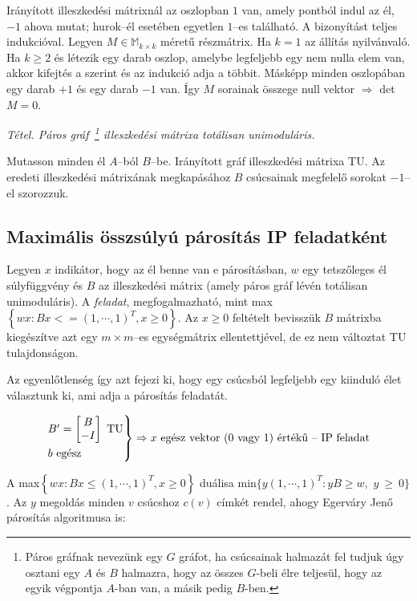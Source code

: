 Irányított illeszkedési mátrixnál az oszlopban $1$ van, amely pontból indul az
él, $-1$ ahova mutat; hurok--él esetében egyetlen $1$--es található. A
bizonyítást teljes indukcióval. Legyen $M \in \mathbb{M}_{k\times k}$ méretű
részmátrix. Ha $k=1$ az állítás nyilvánvaló. Ha $k \geq 2$ és létezik egy darab
oszlop, amelybe legfeljebb egy nem nulla elem van, akkor kifejtés a szerint és az
indukció adja a többit. Másképp minden oszlopában egy darab $+1$ és egy darab
$-1$ van. Így $M$ sorainak összege null vektor $\Rightarrow$ det$M=0$.
\vspace{0.4cm}

\emph{Tétel. Páros gráf~\footnote{Páros gráfnak nevezünk egy $G$ gráfot, ha
csúcsainak halmazát fel tudjuk úgy osztani egy $A$ és $B$ halmazra, hogy az
összes $G$-beli élre teljesül, hogy az egyik végpontja $A$-ban van, a másik
pedig $B$-ben.} illeszkedési mátrixa totálisan unimoduláris.}
\vspace{0.4cm}

Mutasson minden él $A$--ból $B$--be. Irányított gráf illeszkedési mátrixa TU. Az
eredeti illeszkedési mátrixának megkapásához $B$ csúcsainak megfelelő sorokat
$-1$--el szorozzuk.

\subsection{Maximális összsúlyú párosítás IP feladatként}

Legyen $x$ indikátor, hogy az él benne van e párosításban, $w$ egy tetszőleges
él súlyfüggvény és $B$ az illeszkedési mátrix (amely páros gráf lévén totálisan
unimoduláris). A \emph{feladat}, megfogalmazható, mint max$\left\{ wx:Bx <= (1,
\cdots, 1)^T, x \geq 0 \right\}$. Az $x \geq 0 $ feltételt bevisszük $B$
mátrixba kiegészítve azt egy $m \times m$--es egységmátrix ellentettjével, de ez
nem változtat TU tulajdonságon. 

Az egyenlőtlenség így azt fejezi ki, hogy egy csúcsból legfeljebb egy kiinduló
élet választunk ki, ami adja a párosítás feladatát. 

\[
\begin{rcases}
B'=\begin{bmatrix} B \\ -I \end{bmatrix} \text{ TU} \\
b \text{ egész}
\end{rcases} \Rightarrow x \text{ egész vektor ($0$ vagy $1$) értékű -- IP feladat}
\]

A max$\left\{ wx : Bx \leq (1,\cdots,1)^T, x \geq 0 \right\}$ duálisa
min$\{ y(1,\cdots,1)^T : yB \geq w,$ $y~\geq~0\}$. Az $y$ megoldás
minden $v$ csúcshoz $c(v)$ címkét rendel, ahogy Egerváry Jenő párosítás
algoritmusa is:

